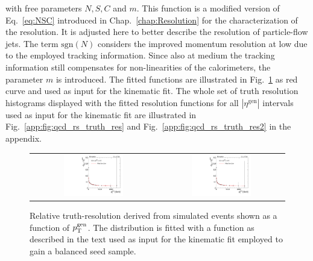with free parameters $N, S, C$ and $m$. This function is a modified version of Eq.~\ref{eq:NSC} introduced in Chap.~\ref{chap:Resolution} for the characterization of the resolution. It is adjusted here to better describe the resolution of particle-flow jets. The term $\mathrm{sgn}(N)$ considers the improved momentum resolution at low \pt due to the employed tracking information. Since also at medium \pt the tracking information still compensates for non-linearities of the calorimeters, the parameter $m$ is introduced. The fitted functions are illustrated in Fig.~\ref{fig:qcd_rs_truth_res} as red curve and used as input for the kinematic fit. The whole set of truth resolution histograms displayed with the fitted resolution functions for all $|\eta^\mathrm{gen}|$ intervals used as input for the kinematic fit are illustrated in Fig.~\ref{app:fig:qcd_rs_truth_res} and Fig.~\ref{app:fig:qcd_rs_truth_res2} in the appendix. 
\begin{figure}[!t]
  \centering
  \begin{tabular}{cc}
                \includegraphics[width=0.49\textwidth]{figures/TruthRes_Eta0.pdf} &
                \includegraphics[width=0.49\textwidth]{figures/TruthRes_Eta1.pdf} 
  \end{tabular}
  \caption{Relative truth-\pt resolution derived from simulated events shown as a function of $p_{\text{T}}^\mathrm{gen}$. The distribution is fitted with a function as described in the text used as input for the kinematic fit employed to gain a balanced seed sample.}
  \label{fig:qcd_rs_truth_res}
\end{figure}
\\
